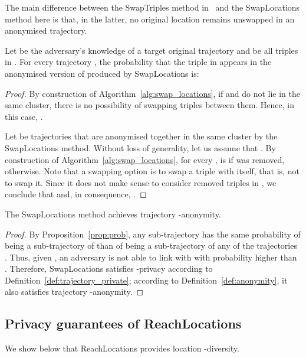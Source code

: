 The main difference between the SwapTriples method
in~\cite{domingo10springl} and the SwapLocations method here
is that, in the latter, no original location
remains unswapped in an anonymised trajectory.

\begin{proposition} \label{prop:prob}
Let  be the adversary's knowledge of a target
original trajectory  and
 be all triples in .
For every trajectory , the probability
that the triple  in  appears in the anonymised version  of  produced by SwapLocations is:

\end{proposition}

\begin{proof} 
By construction of Algorithm~\ref{alg:swap_locations},
if  and  do not lie in the same cluster, there is no
possibility of swapping triples between them. Hence, in this
case, .

Let  be  trajectories that
are anonymised together in the same cluster by the SwapLocations method.
Without loss of generality, let us assume that .
By construction of Algorithm~\ref{alg:swap_locations},
for every , 
is  if  was removed,  otherwise.
Note that a swapping option is to swap a triple with itself,
that is, not to swap it.
Since it does not make sense to consider removed triples in ,
we conclude that  and,
in consequence, . 
\end{proof}

\begin{theorem} \label{theo:anonymity}
The SwapLocations method achieves trajectory -anonymity.
\end{theorem}

\begin{proof} 
By Proposition~\ref{prop:prob},
any sub-trajectory  has the same probability
of being a sub-trajectory of  than of being a sub-trajectory
of any of the  trajectories .
Thus, given , an adversary is not able to link 
with  with probability higher than .
Therefore, SwapLocations satisfies -privacy
according to Definition~\ref{def:trajectory_private}; according
to Definition~\ref{def:anonymity}, it also satisfies
trajectory -anonymity.
\end{proof}

\subsection{Privacy guarantees of ReachLocations}
\label{guaranteesreach}

We show below that ReachLocations
provides location -diversity.

